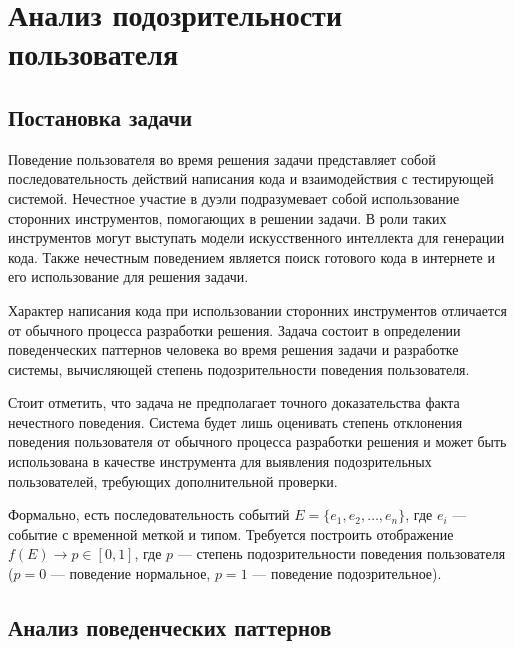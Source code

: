 \section{Анализ подозрительности пользователя}

\subsection{Постановка задачи}

Поведение пользователя во время решения задачи представляет собой последовательность
действий написания кода и взаимодействия с тестирующей системой.
Нечестное участие в дуэли подразумевает собой использование сторонних инструментов, помогающих в решении задачи.
В роли таких инструментов могут выступать модели искусственного интеллекта для генерации кода.
Также нечестным поведением является поиск готового кода в интернете и его использование для решения задачи.

Характер написания кода при использовании сторонних инструментов отличается от обычного процесса разработки решения.
Задача состоит в определении поведенческих паттернов человека во время решения задачи и
разработке системы, вычисляющей степень подозрительности поведения пользователя.

Стоит отметить, что задача не предполагает точного доказательства факта нечестного поведения.
Система будет лишь оценивать степень отклонения поведения пользователя от обычного процесса разработки решения и
может быть использована в качестве инструмента для выявления подозрительных пользователей, требующих дополнительной проверки.

Формально, есть последовательность событий $E = \{e_1, e_2, \dots, e_n\}$, где $e_i$ --- событие с временной меткой и типом.
Требуется построить отображение $f(E) \to p \in [0, 1]$,
где $p$ --- степень подозрительности поведения пользователя ($p = 0$ --- поведение нормальное, $p = 1$ --- поведение подозрительное).

\subsection{Анализ поведенческих паттернов}

